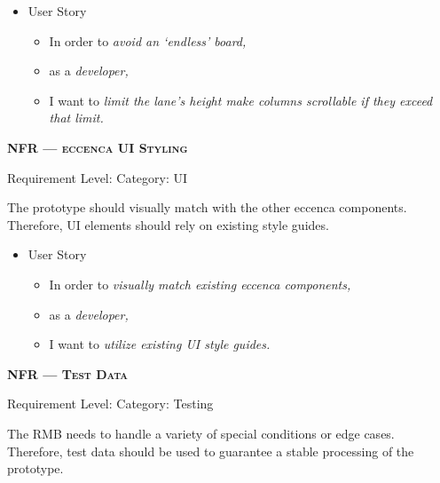 \begin{itemize}[after=\vspace{1em}]
    \setlength\itemsep{-0.5em}
	\item[] User Story\\[-7.8mm]
	\begin{itemize}
    \setlength\itemsep{-0.5em}
        \item[] In order to \textit{avoid an ‘endless’ board,}
        \item[] as a \textit{developer,}
        \item[] I want to \textit{limit the lane’s height  make columns scrollable if they exceed that limit.}
    \end{itemize}
\end{itemize}






\centerline{\textbf{NFR\textsubscript{} --- \textsc{eccenca \acrshort*{UI} Styling}}}
\centerline{\small Requirement Level:  \quad{} Category: \acrshort*{UI}}

\noindent The prototype should visually match with the other eccenca components. Therefore, \acrshort*{UI} elements should rely on existing style guides.

\begin{itemize}[after=\vspace{1em}]
    \setlength\itemsep{-0.5em}
	\item[] User Story\\[-7.8mm]
	\begin{itemize}
    \setlength\itemsep{-0.5em}
        \item[] In order to \textit{visually match existing eccenca components,}
        \item[] as a \textit{developer,}
        \item[] I want to \textit{utilize existing \acrshort*{UI} style guides.}
    \end{itemize}
\end{itemize}



\centerline{\textbf{NFR\textsubscript{} --- \textsc{Test Data}}}
\centerline{\small Requirement Level:  \quad{} Category: Testing}

\noindent The \acrshort*{RMB} needs to handle a variety of special conditions or edge cases. Therefore, test data should be used to guarantee a stable processing of the prototype.

